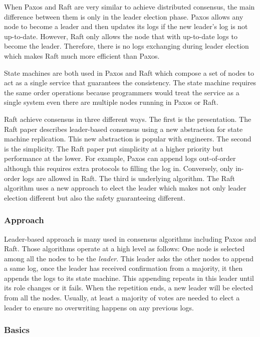 \documentclass[12pt, a4paper]{article}
\begin{document}
When Paxos and Raft are very similar to achieve distributed consensus,
the main difference between them is only in the leader election phase.
Paxos allows any node to become a leader and then updates its logs
if the new leader's log is not up-to-date. 
However, Raft only allows the node that with up-to-date logs to become the leader.
Therefore, there is no logs exchanging during leader election 
which makes Raft much more efficient than Paxos. 

State machines are both used in Paxos and Raft which compose a set of nodes 
to act as a single service that guarantees the consistency. 
The state machine requires the same order operations because 
programmers would treat the service as a single system even there are 
multiple nodes running in Paxos or Raft.

Raft achieve consensus in three different ways.
The first is the presentation. The Raft paper describes leader-based consensus 
using a new abstraction for state machine replication.
This new abstraction is popular with engineers.
The second is the simplicity. The Raft paper put simplicity at a higher priority but 
performance at the lower. For example, Paxos can append logs out-of-order 
although this requires extra protocols to filling the log in. 
Conversely, only in-order logs are allowed in Raft.
The third is underlying algorithm. The Raft algorithm uses a new approach to elect
the leader which makes not only leader election different 
but also the safety guaranteeing different.

\subsubsection{Approach}
Leader-based approach is many used in consensus algorithms including Paxos and Raft.
Those algorithms operate at a high level as follows:
One node is selected among all the nodes to be the \textit{leader}.
This leader asks the other nodes to append a same log, 
once the leader has received confirmation from a majority,
it then appends the logs to its state machine. This appending repeats in this leader until
its role changes or it fails.
When the repetition ends, a new leader will be elected from all the nodes.
Usually, at least a majority of votes are needed to elect a leader to 
ensure no overwriting happens on any previous logs.
\subsubsection{Basics}
\end{document}
